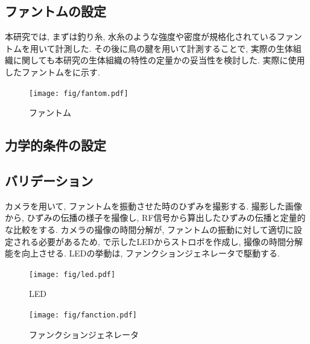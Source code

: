 \subsection{ファントムの設定}
本研究では, まずは釣り糸, 水糸のような強度や密度が規格化されているファントムを用いて計測した. その後に鳥の腱を用いて計測することで, 実際の生体組織に関しても本研究の生体組織の特性の定量かの妥当性を検討した. 実際に使用したファントムをに示す.
\begin{figure}[H]
  \begin{center}
    \texttt{[image: fig/fantom.pdf]}
  \end{center}
  \caption{ファントム}
\end{figure}
\subsection{力学的条件の設定}
\subsection{バリデーション}
カメラを用いて, ファントムを振動させた時のひずみを撮影する. 撮影した画像から, ひずみの伝播の様子を撮像し, RF信号から算出したひずみの伝播と定量的な比較をする. カメラの撮像の時間分解が, ファントムの振動に対して適切に設定される必要があるため, で示したLEDからストロボを作成し, 撮像の時間分解能を向上させる. LEDの挙動は, ファンクションジェネレータで駆動する. 
\begin{figure}[H]
 \begin{minipage}{0.5\hsize}
  \begin{center}
   \texttt{[image: fig/led.pdf]}
  \end{center}
  \caption{LED}
 \end{minipage}
 \begin{minipage}{0.5\hsize}
 \begin{center}
  \texttt{[image: fig/fanction.pdf]}
 \end{center}
  \caption{ファンクションジェネレータ }
 \end{minipage}
\end{figure}
